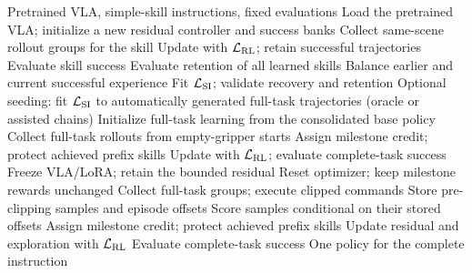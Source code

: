 \begin{algorithm}[!t]
\caption{Staged VLA adaptation}
\label{alg:paper_pipeline}
\small
\begin{algorithmic}[1]
\Require Pretrained VLA, simple-skill instructions, fixed evaluations
\State Load the pretrained VLA; initialize a new residual controller and success banks
        \Repeat
            \State Collect same-scene rollout groups for the skill
            \State Update with $\mathcal L_{\rm RL}$; retain successful trajectories
            \State Evaluate skill success
        \State Evaluate retention of all learned skills
            \State Balance earlier and current successful experience
            \State Fit $\mathcal L_{\rm SI}$; validate recovery and retention
        \EndIf
    \EndFor
\EndFor
{}
    \State Optional seeding: fit $\mathcal L_{\rm SI}$ to automatically generated
    \Statex \hspace{\algorithmicindent}full-task trajectories (oracle or assisted chains)
\EndIf
\State Initialize full-task learning from the consolidated base policy
\Repeat
    \State Collect full-task rollouts from empty-gripper starts
    \State Assign milestone credit; protect achieved prefix skills
    \State Update with $\mathcal L_{\rm RL}$; evaluate complete-task success
    \State Freeze VLA/LoRA; retain the bounded residual
    \State Reset optimizer; keep milestone rewards unchanged
    \Repeat
        \State Collect full-task groups; execute clipped commands
        \State Store pre-clipping samples and episode offsets
        \State Score samples conditional on their stored offsets
        \State Assign milestone credit; protect achieved prefix skills
        \State Update residual and exploration with $\mathcal L_{\rm RL}$
        \State Evaluate complete-task success
\EndIf
\State \Return One policy for the complete instruction
\end{algorithmic}
\end{algorithm}
